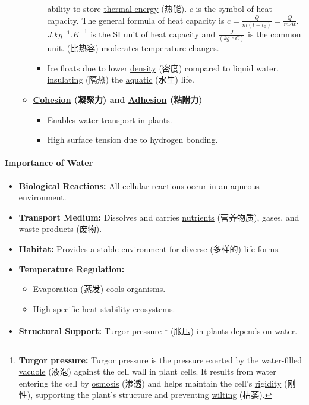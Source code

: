 \begin{itemize}
\begin{itemize}
\begin{itemize}
{            ability to store \underline{thermal energy} (热能). $c$ is the symbol of heat capacity. The general formula of heat
            capacity is $c = \frac{Q}{m (t - t_0)} = \frac{Q}{m \Delta t}$. $\unit{J.kg^{-1}.K^{-1}}$ is the SI unit of heat
            capacity and $\frac{J}{(kg \cdot ^{\circ} C)}$ is the common unit.} (比热容) moderates temperature changes.
            \item Ice floats due to lower \underline{density} (密度) compared to liquid water, \underline{insulating} (隔热) the
            \underline{aquatic} (水生) life.
        \end{itemize}
        \item \textbf{\underline{Cohesion} (凝聚力) and \underline{Adhesion} (粘附力)}
        \begin{itemize}
            \item Enables water transport in plants.
            \item High surface tension due to hydrogen bonding.
        \end{itemize}
    \end{itemize}
\end{itemize}

\paragraph{Importance of Water}
\begin{itemize}
    \item \textbf{Biological Reactions:} All cellular reactions occur in an aqueous environment.
    \item \textbf{Transport Medium:} Dissolves and carries \underline{nutrients} (营养物质), gases, and \underline{waste products}
    (废物).
    \item \textbf{Habitat:} Provides a stable environment for \underline{diverse} (多样的) life forms.
    \item \textbf{Temperature Regulation:}
    \begin{itemize}
        \item \underline{Evaporation} (蒸发) cools organisms.
        \item High specific heat stability ecosystems.
    \end{itemize}
    \item \textbf{Structural Support:} \underline{Turgor pressure} \footnote{\textbf{Turgor pressure:} Turgor pressure is the
    pressure exerted by the water-filled \underline{vacuole} (液泡) against the cell wall in plant cells. It results from water
    entering the cell by \underline{osmosis} (渗透) and helps maintain the cell's \underline{rigidity} (刚性), supporting the
    plant's structure and preventing \underline{wilting} (枯萎).} (胀压) in plants depends on water.
\end{itemize}

